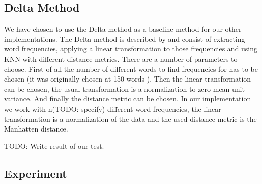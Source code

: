 

%
%
%

\subsection{Delta Method}
We have chosen to use the Delta method as a baseline method for our other
implementations. The Delta method is described by \cite{evert2015towards} and
consist of extracting word frequencies, applying a linear transformation to
those frequencies and using KNN with different distance metrics. There are a
number of parameters to choose. First of all the number of different words
to find frequencies for has to be chosen (it was originally chosen at 150
words \cite{evert2015towards}). Then the linear transformation can be chosen,
the usual transformation is a normalization to zero mean unit variance. And
finally the distance metric can be chosen. In our implementation we work with
n(TODO: specify) different word frequencies, the linear transformation is
a normalization of the data and the used distance metric is the Manhatten
distance.

TODO: Write result of our test.


\subsection{Experiment}
